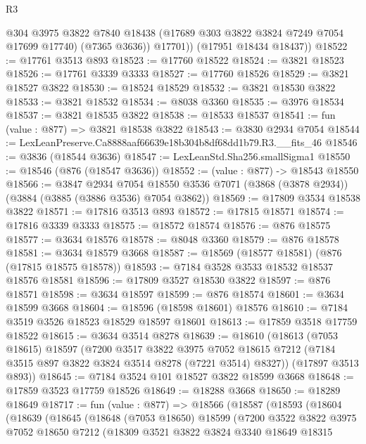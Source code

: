 \begin{lexlean}{R3}
\begin{coremodule}
            @304
            @3975
            @3822
            @7840
            @18438
            (@17689 @303 @3822 @3824 @7249 @7054 @17699 @17740)
            (@7365 @3636))
          @17701))
      (@17951 @18434 @18437))
@18522 := @17761 @3513 @893
@18523 := @17760 @18522
@18524 := @3821 @18523
@18526 := @17761 @3339 @3333
@18527 := @17760 @18526
@18529 := @3821 @18527 @3822
@18530 := @18524 @18529
@18532 := @3821 @18530 @3822
@18533 := @3821 @18532
@18534 := @8038 @3360
@18535 := @3976 @18534
@18537 := @3821 @18535 @3822
@18538 := @18533 @18537
@18541 := fun (value : @877) => @3821 @18538 @3822
@18543 := @3830 @2934 @7054
@18544 := LexLeanPreserve.Ca8888aaf66639e18b304b8df68dd1b79.R3.__fits_46
@18546 := @3836 (@18544 @3636)
@18547 := LexLeanStd.Sha256.smallSigma1
@18550 := @18546 (@876 (@18547 @3636))
@18552 := (value : @877) -> @18543 @18550
@18566 := @3847
    @2934
    @7054
    @18550
    @3536
    @7071
    (@3868 (@3878 @2934))
    (@3884 (@3885 (@3886 @3536) @7054 @3862))
@18569 := @17809 @3534 @18538 @3822
@18571 := @17816 @3513 @893
@18572 := @17815 @18571
@18574 := @17816 @3339 @3333
@18575 := @18572 @18574
@18576 := @876 @18575
@18577 := @3634 @18576
@18578 := @8048 @3360
@18579 := @876 @18578
@18581 := @3634 @18579 @3668
@18587 := @18569 (@18577 @18581) (@876 (@17815 @18575 @18578))
@18593 := @7184 @3528 @3533 @18532 @18537 @18576 @18581
@18596 := @17809 @3527 @18530 @3822
@18597 := @876 @18571
@18598 := @3634 @18597
@18599 := @876 @18574
@18601 := @3634 @18599 @3668
@18604 := @18596 (@18598 @18601) @18576
@18610 := @7184 @3519 @3526 @18523 @18529 @18597 @18601
@18613 := @17859 @3518 @17759 @18522
@18615 := @3634 @3514 @8278
@18639 := @18610
    (@18613
      (@7053 @18615)
      @18597
      (@7200
        @3517
        @3822
        @3975
        @7052
        @18615
        @7212
        (@7184 @3515 @897 @3822 @3824 @3514 @8278 (@7221 @3514) @8327))
      (@17897 @3513 @893))
@18645 := @7184 @3524 @101 @18527 @3822 @18599 @3668
@18648 := @17859 @3523 @17759 @18526
@18649 := @18288 @3668
@18650 := @18289 @18649
@18717 := fun (value : @877) =>
  @18566
    (@18587
      (@18593
        (@18604
          (@18639
            (@18645
              (@18648
                (@7053 @18650)
                @18599
                (@7200
                  @3522
                  @3822
                  @3975
                  @7052
                  @18650
                  @7212
                  (@18309
                    @3521
                    @3822
                    @3824
                    @3340
                    @18649
                    @18315

\end{coremodule}
\end{lexlean}
